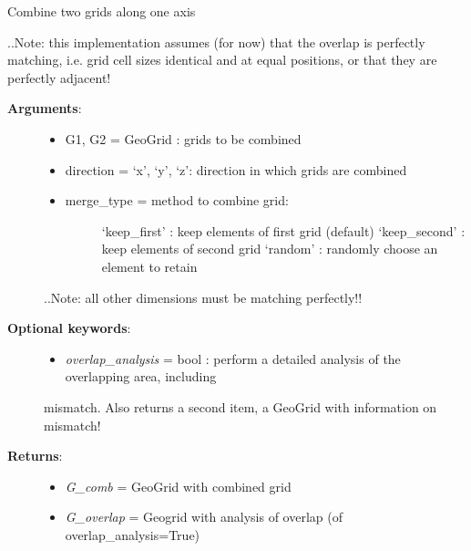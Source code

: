 \documentclass[letterpaper,10pt,english]{sphinxmanual}
\begin{document}
\begin{fulllineitems}
\label{pygeomod:pygeomod.geogrid.combine_grids}
Combine two grids along one axis

..Note: this implementation assumes (for now) that the overlap is perfectly matching,
i.e. grid cell sizes identical and at equal positions, or that they are perfectly adjacent!
\begin{description}
\item[{\textbf{Arguments}:}] \leavevmode\begin{itemize}
\item {} 
G1, G2 = GeoGrid : grids to be combined

\item {} 
direction = `x', `y', `z': direction in which grids are combined

\item {} \begin{description}
\item[{merge\_type = method to combine grid:}] \leavevmode
`keep\_first' : keep elements of first grid (default)
`keep\_second' : keep elements of second grid
`random' : randomly choose an element to retain

\end{description}

\end{itemize}

..Note: all other dimensions must be matching perfectly!!

\item[{\textbf{Optional keywords}:}] \leavevmode\begin{itemize}
\item {} 
\emph{overlap\_analysis} = bool : perform a detailed analysis of the overlapping area, including

\end{itemize}

mismatch. Also returns a second item, a GeoGrid with information on mismatch!

\item[{\textbf{Returns}:}] \leavevmode\begin{itemize}
\item {} 
\emph{G\_comb} = GeoGrid with combined grid

\item {} 
\emph{G\_overlap} = Geogrid with analysis of overlap (of overlap\_analysis=True)

\end{itemize}

\end{description}

\end{fulllineitems}
\end{document}
